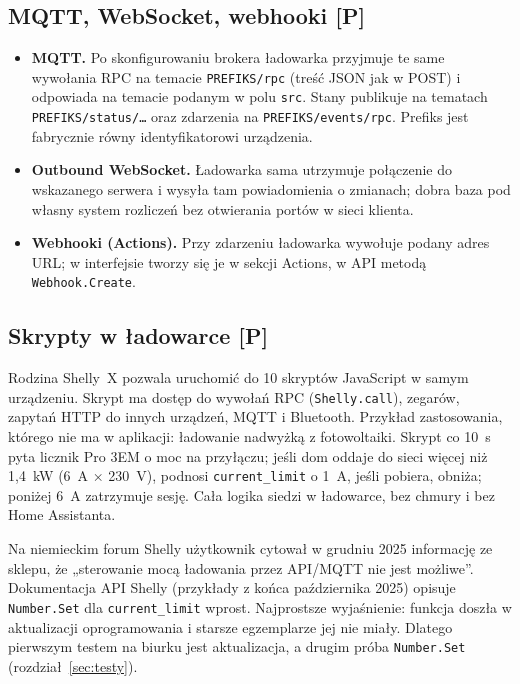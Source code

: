 \documentclass[11pt,a4paper]{article}
\newcommand{\tagP}{\textcolor{apgreen}{\textbf{[P]}}}
\newcommand{\code}[1]{\texttt{#1}}
\begin{document}
\subsection{MQTT, WebSocket, webhooki \tagP}

\begin{itemize}
\item \textbf{MQTT.} Po skonfigurowaniu brokera ładowarka przyjmuje te same wywołania RPC na temacie \code{PREFIKS/rpc} (treść JSON jak w POST) i odpowiada na temacie podanym w polu \code{src}. Stany publikuje na tematach \code{PREFIKS/status/…} oraz zdarzenia na \code{PREFIKS/events/rpc}. Prefiks jest fabrycznie równy identyfikatorowi urządzenia.
\item \textbf{Outbound WebSocket.} Ładowarka sama utrzymuje połączenie do wskazanego serwera i wysyła tam powiadomienia o zmianach; dobra baza pod własny system rozliczeń bez otwierania portów w sieci klienta.
\item \textbf{Webhooki (Actions).} Przy zdarzeniu ładowarka wywołuje podany adres URL; w interfejsie tworzy się je w sekcji Actions, w API metodą \code{Webhook.Create}.
\end{itemize}

\subsection{Skrypty w ładowarce \tagP}

Rodzina Shelly~X pozwala uruchomić do 10 skryptów JavaScript w samym urządzeniu. Skrypt ma dostęp do wywołań RPC (\code{Shelly.call}), zegarów, zapytań HTTP do innych urządzeń, MQTT i Bluetooth. Przykład zastosowania, którego nie ma w aplikacji: ładowanie nadwyżką z fotowoltaiki. Skrypt co 10~s pyta licznik Pro 3EM o moc na przyłączu; jeśli dom oddaje do sieci więcej niż 1,4~kW (6~A × 230~V), podnosi \code{current\_limit} o 1~A, jeśli pobiera, obniża; poniżej 6~A zatrzymuje sesję. Cała logika siedzi w ładowarce, bez chmury i bez Home Assistanta.

\begin{uwaga}
Na niemieckim forum Shelly użytkownik cytował w grudniu 2025 informację ze sklepu, że „sterowanie mocą ładowania przez API/MQTT nie jest możliwe”. Dokumentacja API Shelly (przykłady z końca października 2025) opisuje \code{Number.Set} dla \code{current\_limit} wprost. Najprostsze wyjaśnienie: funkcja doszła w aktualizacji oprogramowania i starsze egzemplarze jej nie miały. Dlatego pierwszym testem na biurku jest aktualizacja, a drugim próba \code{Number.Set} (rozdział~\ref{sec:testy}).
\end{uwaga}
\end{document}
